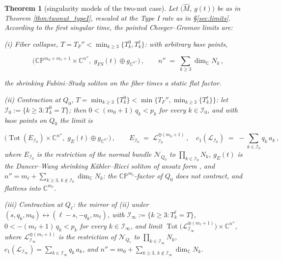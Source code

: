 \documentclass[11pt]{amsart}
\theoremstyle{plain}
\numberwithin{equation}{section}
\newtheorem{theorem}{Theorem}[section]
\theoremstyle{definition}
\theoremstyle{remark}
\begin{document}
\begin{theorem}[singularity models of the two-nut case]\label{thm:twonut_models}
Let $\big(\widehat{M}$, $g (t)\big)$ be as in Theorem \ref{thm:twonut_typeI}, rescaled at the Type I rate as in \S\ref{sec:limits}. According to the first singular time, the pointed Cheeger--Gromov limits are:

\emph{(i) Fiber collapse}, $T = T_F'' < \min_{k \geq 3} \{ T_k^0, T_k^\ell \}$: with arbitrary base points,

\[
\big( \mathbb{CP}^{m_0 + m_\ell + 1} \times \mathbb{C}^{n''} , \; g_{FS} (t) \oplus g_{\mathbb{C}^{n''}} \big) \,, \qquad n'' \;=\; \sum_{k \geq 3} \dim_{\mathbb{C}} N_k \,,
\]

the shrinking Fubini--Study soliton on the fiber times a static flat factor.

\emph{(ii) Contraction at $Q_0$}, $T = \min_{k \geq 3} \{ T_k^0 \} < \min \big\{ T_F'', \min_{k \geq 3} \{ T_k^\ell \} \big\}$: let $\mathcal{I}_0 := \{ k \geq 3 : T_k^0 = T \}$; then $0 < ( m_0 + 1 )\, q_k < p_k$ for every $k \in \mathcal{I}_0$, and with base points on $Q_0$ the limit is

\[
\big( \operatorname{Tot} ( E_{\mathcal{I}_0} ) \times \mathbb{C}^{n''} , \; g_E (t) \oplus g_{\mathbb{C}^{n''}} \big) \,, \qquad E_{\mathcal{I}_0} \;=\; \mathcal{L}_{\mathcal{I}_0}^{\oplus ( m_0 + 1 )} \,, \quad c_1 ( \mathcal{L}_{\mathcal{I}_0} ) \;=\; - \sum_{k \in \mathcal{I}_0} q_k\, a_k \,,
\]
where $E_{\mathcal{I}_0}$ is the restriction of the normal bundle $\mathcal{N}_{Q_0}$ to $\prod_{k \in \mathcal{I}_0} N_k$, $g_E (t)$ is the Dancer--Wang shrinking K\"ahler--Ricci soliton of ansatz form \cite[Theorem 3.36]{DW2011}, and $n'' = m_\ell + \sum_{k \geq 3, \, k \not\in \mathcal{I}_0} \dim_{\mathbb{C}} N_k$: the $\mathbb{CP}^{m_\ell}$-factor of $Q_0$ does not contract, and flattens into $\mathbb{C}^{m_\ell}$.

\emph{(iii) Contraction at $Q_\ell$}: the mirror of (ii) under $( s, q_k, m_0 ) \leftrightarrow ( \ell - s, - q_k, m_\ell )$, with $\mathcal{I}_\infty := \{ k \geq 3 : T_k^\ell = T \}$, $0 < - ( m_\ell + 1 )\, q_k < p_k$ for every $k \in \mathcal{I}_\infty$, and limit $\operatorname{Tot} \big( \mathcal{L}_{\mathcal{I}_\infty}^{\oplus ( m_\ell + 1 )} \big) \times \mathbb{C}^{n''}$, where $\mathcal{L}_{\mathcal{I}_\infty}^{\oplus ( m_\ell + 1 )}$ is the restriction of $\mathcal{N}_{Q_\ell}$ to $\prod_{k \in \mathcal{I}_\infty} N_k$, $c_1 ( \mathcal{L}_{\mathcal{I}_\infty} ) = \sum_{k \in \mathcal{I}_\infty} q_k\, a_k$, and $n'' = m_0 + \sum_{k \geq 3, \, k \not\in \mathcal{I}_\infty} \dim_{\mathbb{C}} N_k$.


\end{theorem}
\end{document}
